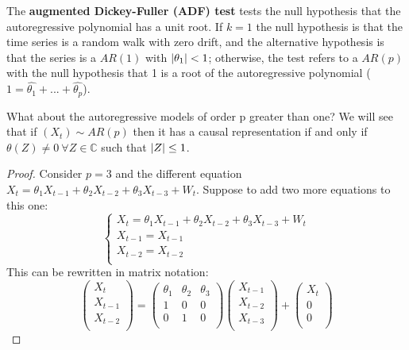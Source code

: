  The \textbf{augmented Dickey-Fuller (ADF) test} tests the null hypothesis that the autoregressive polynomial has a unit root. If $k=1$ the null hypothesis is that the time series is a random walk with zero drift, and the alternative hypothesis is that the series is a $AR(1)$ with $\left|\theta_1\right|<1$; otherwise, the test refers to a $AR(p)$ with the null hypothesis that 1 is a root of the autoregressive polynomial ($1=\hat{\theta_1}+...+\hat{\theta_p}$).

 What about the autoregressive models of order p greater than one? We will see that if $(X_t)\sim AR(p)$ then it has a causal representation if and only if $\theta(Z)\ne0\ \forall Z\in\mathbb{C}$ such that $\left|Z\right|\le1$.

 \begin{proof}
    Consider $p=3$ and the different equation $X_t=\theta_1X_{t-1}+\theta_2X_{t-2}+\theta_3X_{t-3}+W_t$. Suppose to add two more equations to this one:
    \[
        \begin{cases}
            X_t=\theta_1X_{t-1}+\theta_2X_{t-2}+\theta_3X_{t-3}+W_t\\
            X_{t-1}=X_{t-1}\\
            X_{t-2}=X_{t-2}\\
        \end{cases}  
    \]
    This can be rewritten in matrix notation:
    \[
        \begin{pmatrix}
            X_t\\
            X_{t-1}\\
            X_{t-2}\\
        \end{pmatrix}
        =
        \begin{pmatrix}
            \theta_1&\theta_2&\theta_3\\
            1&0&0\\
            0&1&0\\
        \end{pmatrix}
        \begin{pmatrix}
            X_{t-1}\\
            X_{t-2}\\
            X_{t-3}\\
        \end{pmatrix}
        +
        \begin{pmatrix}
            X_t\\
            0\\
            0\\

\end{pmatrix}\]
\end{proof}
